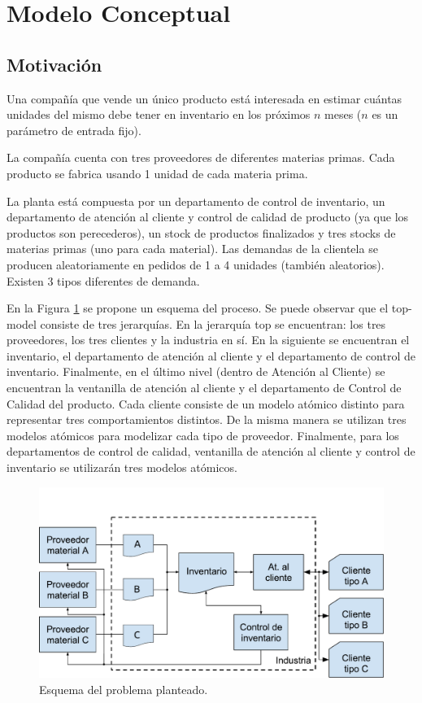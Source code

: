 \documentclass[10pt]{article}
\begin{document}
\section{Modelo Conceptual}
\subsection{Motivación\label{sec:motivacion}}

Una compañía que vende un único producto está interesada en estimar cuántas unidades del mismo debe tener en inventario en los próximos $n$ meses ($n$ es un parámetro de entrada fijo).

La compañía cuenta con tres proveedores de diferentes materias primas. Cada producto se fabrica usando 1 unidad de cada materia prima.

La planta está compuesta por un departamento de control de inventario, un departamento de atención al cliente y control de calidad de producto (ya que los productos son perecederos), un stock de productos finalizados y tres stocks de materias primas (uno para cada material). Las demandas de la clientela se producen aleatoriamente en pedidos de 1 a 4 unidades (también aleatorios). Existen 3 tipos diferentes de demanda.

En la Figura \ref{fig:esquema-del-problema} se propone un esquema del proceso. Se puede observar que el top-model consiste de tres jerarquías. En la jerarquía top se encuentran: los tres proveedores, los tres clientes y la industria en sí. En la siguiente se encuentran el inventario, el departamento de atención al cliente y el departamento de control de inventario. Finalmente, en el último nivel (dentro de Atención al Cliente) se encuentran la ventanilla de atención al cliente y el departamento de Control de Calidad del producto.
Cada cliente consiste de un modelo atómico distinto para representar tres comportamientos distintos. De la misma manera se utilizan tres modelos atómicos para modelizar cada tipo de proveedor. Finalmente, para los departamentos de control de calidad, ventanilla de atención al cliente y control de inventario se utilizarán tres modelos atómicos.

\begin{figure}[h]
\centering
\includegraphics[width=\textwidth]{img/figura1}
\caption{Esquema del problema planteado.}
\label{fig:esquema-del-problema}
\end{figure}
\end{document}
